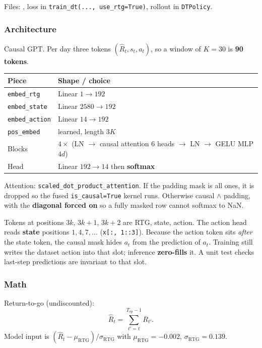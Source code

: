 \documentclass[11pt]{article}
\begin{document}
Files: ,
loss in  \texttt{train\_dt(..., use\_rtg=True)},
rollout in \texttt{DTPolicy}.

\subsubsection{Architecture}

Causal GPT. Per day three tokens $(\hat R_t, s_t, a_t)$, so a window of
$K=30$ is \textbf{90 tokens}.

\begin{center}
\begin{tabular}{@{}ll@{}}
\toprule
Piece & Shape / choice \\
\midrule
\texttt{embed\_rtg}     & Linear $1\to 192$ \\
\texttt{embed\_state}   & Linear $2580\to 192$ \\
\texttt{embed\_action}  & Linear $14\to 192$ \\
\texttt{pos\_embed}     & learned, length $3K$ \\
Blocks                  & $4\times$ (LN $\to$ causal attention 6 heads $\to$ LN $\to$ GELU MLP $4d$) \\
Head                    & Linear $192\to 14$ then \textbf{softmax} \\
\bottomrule
\end{tabular}
\end{center}

Attention: \texttt{scaled\_dot\_product\_attention}.
If the padding mask is all ones, it is dropped so the fused
\texttt{is\_causal=True} kernel runs. Otherwise causal $\land$ padding, with
the \textbf{diagonal forced on} so a fully masked row cannot softmax to NaN.

Tokens at positions $3k$, $3k+1$, $3k+2$ are RTG, state, action.
The action head reads \textbf{state} positions $1,4,7,\ldots$
(\texttt{x[:, 1::3]}). Because the action token sits \emph{after} the state
token, the causal mask hides $a_t$ from the prediction of $a_t$.
Training still writes the dataset action into that slot; inference
\textbf{zero-fills} it. A unit test checks last-step predictions are invariant
to that slot.

\subsubsection{Math}

Return-to-go (undiscounted):
\begin{equation}
\hat R_t=\sum_{t'=t}^{T_{\mathrm{ep}}-1} R_{t'}.
\end{equation}
Model input is $(\hat R_t-\mu_{\mathrm{RTG}})/\sigma_{\mathrm{RTG}}$ with
$\mu_{\mathrm{RTG}}=-0.002$, $\sigma_{\mathrm{RTG}}=0.139$.
\end{document}
